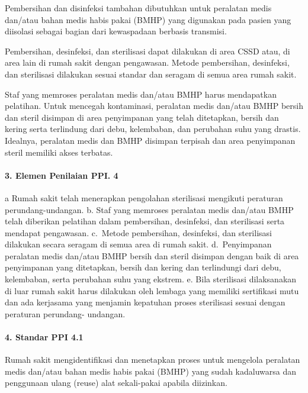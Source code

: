 \documentclass[
]{book}
\begin{document}
Pembersihan dan disinfeksi tambahan dibutuhkan untuk peralatan medis dan/atau bahan medis habis pakai (BMHP) yang digunakan pada pasien yang diisolasi sebagai bagian dari kewaspadaan berbasis transmisi.

Pembersihan, desinfeksi, dan sterilisasi dapat dilakukan di area CSSD atau, di area lain di rumah sakit dengan pengawasan. Metode pembersihan, desinfeksi, dan sterilisasi dilakukan sesuai standar dan seragam di semua area rumah sakit.

Staf yang memroses peralatan medis dan/atau BMHP harus mendapatkan pelatihan. Untuk mencegah kontaminasi, peralatan medis dan/atau BMHP bersih dan steril disimpan di area penyimpanan yang telah ditetapkan, bersih dan kering serta terlindung dari debu, kelembaban, dan perubahan suhu yang drastis. Idealnya, peralatan medis dan BMHP disimpan terpisah dan area penyimpanan steril memiliki akses terbatas.

\hypertarget{elemen-penilaian-ppi.-4}{%
\paragraph*{3. Elemen Penilaian PPI. 4}\label{elemen-penilaian-ppi.-4}}

a Rumah sakit telah menerapkan pengolahan sterilisasi mengikuti peraturan perundang-undangan.
b. Staf yang memroses peralatan medis dan/atau BMHP telah diberikan pelatihan dalam pembersihan, desinfeksi, dan sterilisasi serta mendapat pengawasan.
c.~Metode pembersihan, desinfeksi, dan sterilisasi dilakukan secara seragam di semua area di rumah sakit.
d.~Penyimpanan peralatan medis dan/atau BMHP bersih dan steril disimpan dengan baik di area penyimpanan yang ditetapkan, bersih dan kering dan terlindungi dari debu, kelembaban, serta perubahan suhu yang ekstrem.
e. Bila sterilisasi dilaksanakan di luar rumah sakit harus dilakukan oleh lembaga yang memiliki sertifikasi mutu dan ada kerjasama yang menjamin kepatuhan proses sterilisasi sesuai dengan peraturan perundang- undangan.

\hypertarget{standar-ppi-4.1}{%
\paragraph*{4. Standar PPI 4.1}\label{standar-ppi-4.1}}

Rumah sakit mengidentifikasi dan menetapkan proses untuk mengelola peralatan medis dan/atau bahan medis habis pakai (BMHP) yang sudah kadaluwarsa dan penggunaan ulang (reuse) alat sekali-pakai apabila diizinkan.
\end{document}

